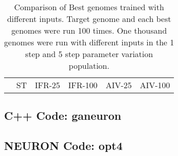 \begin{table}[tp]
 \centering
 \caption{Comparison of Best genomes trained with different
   inputs.  Target genome and each {\GA} best genomes were run 100
   times. One thousand genomes were run with different inputs in the 1
   step and 5 step parameter variation population.}\label{tab:GA:5}
 \begin{tabular}{p{1.0in}*{10}{c}}
\hline
                        & \multicolumn{2}{c}{ST}  & \multicolumn{2}{c}{IFR-25} & \multicolumn{2}{c}{IFR-100} & \multicolumn{2}{c}{AIV-25} & \multicolumn{2}{c}{AIV-100} \\
 \end{tabular}
 \end{table}


\subsection{C++ Code: \textsf{ganeuron}}\label{sec:GA:c++-code}

\subsection{NEURON Code: \textsf{opt4}}\label{sec:GA:neuron-code}



\clearpage


